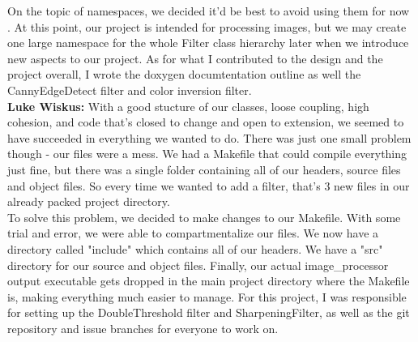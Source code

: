 On the topic of namespaces, we decided it'd be best to avoid using them for now \cite{namespace}.
At this point, our project is intended for processing images, but we may create one large 
namespace for the whole Filter class hierarchy later when we introduce new aspects to our project.  
As for what I contributed to the design and the project overall, I wrote the doxygen documtentation 
outline as well the CannyEdgeDetect filter and color inversion filter. \\



\textbf{Luke Wiskus:}
With a good stucture of our classes, loose coupling, high cohesion, and code that's closed to change 
and open to extension, we seemed to have succeeded in everything we wanted to do.  There was just 
one small problem though - our files were a mess.  We had a Makefile that could 
compile everything just fine, but there was a single folder containing all of our headers, source files 
and object files.  So every time we wanted to add a filter, that's 3 new files in our already packed 
project directory. \\

To solve this problem, we decided to make changes to our Makefile.  With some trial and error, we were 
able to compartmentalize our files.  We now have a directory called "include" which contains all of our 
headers.  We have a "src" directory for our source and object files.  Finally, our actual image\_processor 
output executable gets dropped in the main project directory where the Makefile is, making 
everything much easier to manage.  For this project, I was responsible for setting up the DoubleThreshold 
filter and SharpeningFilter, as well as the git repository and issue branches for everyone to work on.
